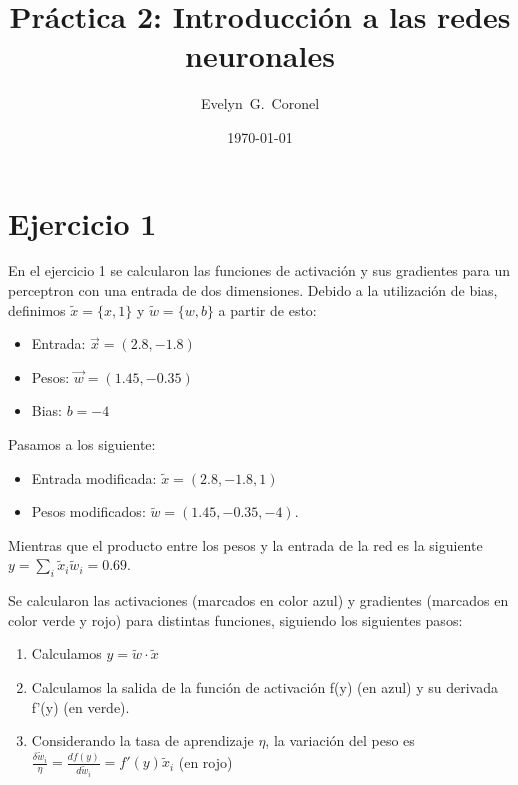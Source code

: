 
\usepackage{multirow}


\title{Práctica 2: Introducción a las redes neuronales}
\author{Evelyn~G.~Coronel}


\date[]{\lowercase{\today}} 

\maketitle

\section*{Ejercicio 1}

En el ejercicio 1 se calcularon las funciones de activación y sus gradientes para un perceptron con una entrada de dos dimensiones. Debido a la utilización  de bias, definimos $\tilde x = \{ x, 1\}$ y $\tilde w =\{ w, b \}$ a partir de esto:
\begin{itemize}
    \item Entrada: $ \vec x = (2.8, -1.8)$
    \item Pesos: $ \vec w = (1.45, -0.35)$
    \item Bias: $b= -4$
\end{itemize}

Pasamos a los siguiente:
\begin{itemize}
\item Entrada modificada: $ \tilde x = (2.8, -1.8, 1)$
\item Pesos modificados: $\tilde  w = (1.45, -0.35, -4)$.
\end{itemize}
Mientras que el producto entre los pesos y la entrada de la red es la siguiente $y = \sum_i \tilde x_i \tilde{w}_i = 0.69$.

Se calcularon las activaciones (marcados en color azul) y gradientes (marcados en color  verde y rojo) para distintas funciones, siguiendo los siguientes pasos:

\begin{enumerate}
    \item Calculamos $y = \tilde{w} \cdot \tilde{x}$  
    \item Calculamos la salida de la función de activación f(y) (en azul)  y su derivada f'(y) (en verde).
    \item Considerando la tasa de aprendizaje $\eta$, la variación del peso es $\frac{\delta \tilde w_i}{\eta} = \frac{df(y)}{d \tilde w_i} = f'(y) \tilde x_i$ (en rojo)
\end{enumerate}

